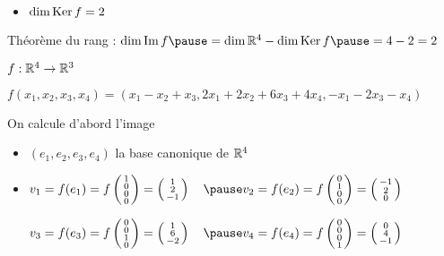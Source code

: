 \begin{frame}
\begin{exemple}
{\begin{itemize}
  \pause
  \item $\dim \mathop{\text{Ker}}\nolimits f = 2$

\end{itemize}
}

\pause
Théorème du rang : $\dim \Im f \pause= \dim \Rr^4 - \dim \Ker f \pause= 4-2 = 2$
\end{exemple}

\end{frame}


\begin{frame}
\begin{exemple}
$f : \mathbb{R}^4 \rightarrow  \mathbb{R}^3$

$f(x_1,x_2,x_3,x_4)=(x_1-x_2+x_3,2x_1+2x_2+6x_3+4x_4,-x_1-2x_3-x_4)$

\smallskip
\pause
{} On calcule d'abord l'image
\pause 
{\small
\begin{itemize}
  \item $(e_1,e_2,e_3,e_4)$ la base canonique de $\mathbb{R}^4$
  
  \pause
  \item   
  $v_1 = f(e_1) = f\left(\begin{smallmatrix} 1 \\ 0 \\ 0 \\0 \end{smallmatrix}\right) 
= \left(\begin{smallmatrix} 1 \\ 2 \\ -1 \end{smallmatrix}\right) \quad
\pause
v_2 = f(e_2) = f\left(\begin{smallmatrix} 0 \\ 1 \\ 0 \\ 0\end{smallmatrix}\right) 
= \left(\begin{smallmatrix} -1 \\ 2 \\ 0 \end{smallmatrix}\right)$

\pause
$
v_3 = f(e_3) = f\left(\begin{smallmatrix} 0 \\ 0 \\ 1 \\  0\end{smallmatrix}\right)
= \left(\begin{smallmatrix} 1 \\ 6 \\ -2 \end{smallmatrix}\right) \quad
\pause
v_4 = f(e_4) = f\left(\begin{smallmatrix} 0 \\ 0 \\ 0 \\1 \end{smallmatrix}\right) 
= \left(\begin{smallmatrix} 0 \\ 4 \\ -1 \end{smallmatrix}\right)
$


\end{itemize}}
\end{exemple}
\end{frame}
